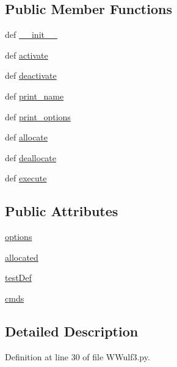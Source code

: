 \subsection*{Public Member Functions}
\begin{DoxyCompactItemize}
\item 
def \hyperlink{classWWulf3_1_1WWulf3_a796bd38c05021cfe1058ece9a27a2df4}{\-\_\-\-\_\-init\-\_\-\-\_\-}
\item 
def \hyperlink{classWWulf3_1_1WWulf3_ae3ed31bec61b4caf00f9f96f6e05ffa1}{activate}
\item 
def \hyperlink{classWWulf3_1_1WWulf3_a3eafeb23e8b080a556a9817b93092c18}{deactivate}
\item 
def \hyperlink{classWWulf3_1_1WWulf3_a9054ae7fc728370cdbf0fc3521332e49}{print\-\_\-name}
\item 
def \hyperlink{classWWulf3_1_1WWulf3_ae507b747f83b985ee062daecc9538f17}{print\-\_\-options}
\item 
def \hyperlink{classWWulf3_1_1WWulf3_a190419acb6dae4278ac923171e0f16e8}{allocate}
\item 
def \hyperlink{classWWulf3_1_1WWulf3_aeeedd5c98d7ed91c4f0beb92a19e23bb}{deallocate}
\item 
def \hyperlink{classWWulf3_1_1WWulf3_a2320c2c37a10d678a6d35ffab6096385}{execute}
\end{DoxyCompactItemize}
\subsection*{Public Attributes}
\begin{DoxyCompactItemize}
\item 
\hyperlink{classWWulf3_1_1WWulf3_adff5ffd43f8b68d49c7b45ab48d7b428}{options}
\item 
\hyperlink{classWWulf3_1_1WWulf3_ad83bab03cfcdab3a5b689a0958db19e8}{allocated}
\item 
\hyperlink{classWWulf3_1_1WWulf3_a9e8732432df9211bd64454c4c0e04098}{test\-Def}
\item 
\hyperlink{classWWulf3_1_1WWulf3_afb4fb9db2456e29872155d9b8738418f}{cmds}
\end{DoxyCompactItemize}


\subsection{Detailed Description}


Definition at line 30 of file W\-Wulf3.\-py.



